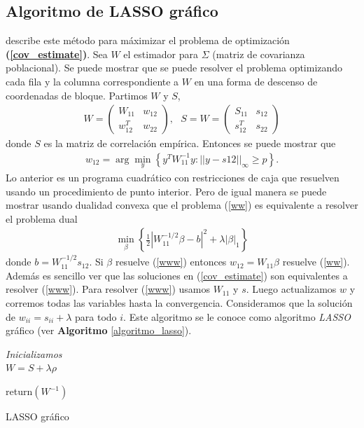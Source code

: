 \documentclass{article}
\begin{document}
\subsection{Algoritmo de LASSO gráfico}
\cite{friedman_sparse_2008} describe este método para máximizar el problema de optimización \textbf{(\ref{cov_estimate})}. Sea $W$ el estimador para $\Sigma$ (matriz de covarianza poblacional). Se puede mostrar que se puede resolver el problema optimizando cada fila y la columna correspondiente a $W$ en una forma de descenso de coordenadas de bloque. Partimos $W$ y $S$,
\begin{align*}
    W=\begin{pmatrix}
    W_{11} & w_{12}\\
    w_{12}^T & w_{22}
    \end{pmatrix}, \ \ \ S= W=\begin{pmatrix}
    S_{11} & s_{12}\\
    s_{12}^T & s_{22}
    \end{pmatrix}
\end{align*}
donde $S$ es la matriz de correlación empírica. Entonces se puede mostrar que
\begin{align}\label{ww}
    w_{12}=\arg \min_y\left\{y^TW_{11}^{-1}y:||y-s12||_\infty\geq p \right\}.
\end{align}
Lo anterior es un programa cuadrático con restricciones de caja que resuelven usando un procedimiento de punto interior. Pero de igual manera se puede mostrar usando dualidad convexa que el problema (\ref{ww}) es  equivalente a resolver el problema dual
\begin{align}\label{www}
    \min_\beta \left\{\frac{1}{2} |W_{11}^{-1/2}\beta-b|^2+\lambda|\beta|_1 \right\}
\end{align}
donde $b=W_{11}^{-1/2}s_{12}$. Si $\beta$ resuelve (\ref{www}) entonces $w_{12}=W_{11}\beta$ resuelve (\ref{ww}). Además es sencillo ver que las soluciones en (\ref{cov_estimate}) son equivalentes a resolver (\ref{www}). Para resolver (\ref{www}) usamos $W_{11}$ y $s$. Luego actualizamos $w$ y corremos todas las variables hasta la convergencia. Consideramos que la solución de $w_{ii}=s_{ii}+\lambda$ para todo $i$. Este algoritmo se le conoce como algoritmo \textit{LASSO} gráfico (ver \textbf{Algoritmo} \ref{algoritmo_lasso}).

\begin{algorithm}[H]
 \textit{Inicializamos}\\
 $W=S+\lambda\rho$

return$\left(W^{-1}\right)$
 
\caption{LASSO gráfico \citep{friedman_sparse_2008}} \label{algoritmo_lasso}
\end{algorithm}
\end{document}
